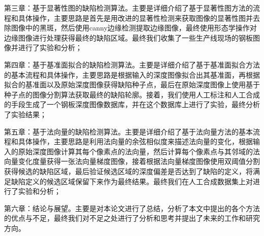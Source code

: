     第三章：基于显著性图的缺陷检测算法。主要是详细介绍了基于显著性图方法的流程和具体操作，主要思路是首先是用改进的显著性检测来获取图像的显著性图并去除图像中的黑斑，然后使用canny边缘检测提取边缘图像，最终使用形态学操作对边缘图像进行处理获得最终的缺陷区域。最终我们收集了一些生产线现场的钢板图像并进行了实验和分析；

    第四章：基于基准面拟合的缺陷检测算法。主要是详细介绍了基于基准面拟合方法的基本流程和具体操作，主要思路是根据输入的深度图像拟合出其基准面，再根据拟合的基准面以及原始深度图像获得缺陷种子点，最后在原始深度图像上使用基于种子点的图像分割算法获取最终的缺陷轮廓。接着，我们使用人工标注和人工合成的手段生成了一个钢板深度图像数据库，并在这个数据库上进行了实验，最终分析了实验结果；

    第五章：基于法向量的缺陷检测算法。主要是详细介绍了基于法向量方法的基本流程和具体操作，主要思路是利用法向量的余弦相似度来描述法向量的变化，根据输入的原始深度图像计算其每个像素点的法向量，然后计算每个像素点与其邻域的法向量变化度量获得一张法向量梯度图像，接着根据法向量梯度图像使用双阈值分割获得候选的缺陷区域，最后验证候选区域的深度偏差是否达到了缺陷的定义，将满足缺陷定义的候选区域保留下来作为最终结果。最终我们在人工合成数据集上对进行了实验和分析；

    第六章：结论与展望。主要是对本论文进行了总结，分析了本文中提出的各个方法的优点与不足，最终我们对不足之处进行了分析和思考并提出了未来的工作和研究方向。

